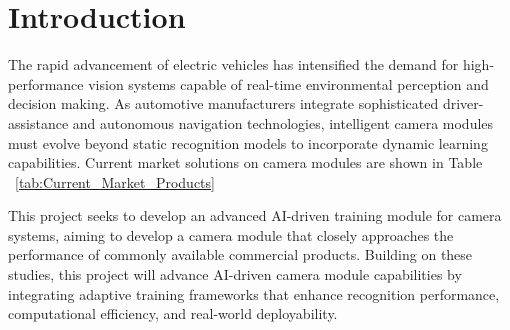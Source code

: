 \documentclass[journal,transmag]{IEEEtran}
\begin{document}
%



\section{Introduction}
% 
% 
% 
% 


\IEEEPARstart
The rapid advancement of electric vehicles has intensified the demand for high-performance vision systems capable of real-time environmental perception and decision making. As automotive manufacturers integrate sophisticated driver-assistance and autonomous navigation technologies, intelligent camera modules must evolve beyond static recognition models to incorporate dynamic learning capabilities. Current market solutions on camera modules are shown in Table ~\ref{tab:Current_Market_Products}

This project seeks to develop an advanced AI-driven training module for camera systems, aiming to develop a camera module that closely approaches the performance of commonly available commercial products. Building on these studies, this project will advance AI-driven camera module capabilities by integrating adaptive training frameworks that enhance recognition performance, computational efficiency, and real-world deployability.
\end{document}

